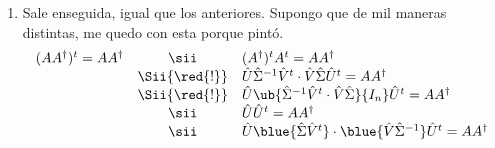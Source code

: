 \begin{enumerate}[label=(\alph*)]
\begin{enumerate}[label=\roman*.]
          \item Sale enseguida, igual que los anteriores. Supongo que de mil maneras distintas, me quedo con esta porque pintó.
                $$
                  \begin{array}{rcl}
                    (A A^\dagger)^t  = AA^\dagger
                     & \sii          &
                    (A^\dagger)^t A^t  = AA^\dagger \\
                     & \Sii{\red{!}} &
                    \hat{U} \hat{\Sigma}^{-1} \hat{V}^t
                    \cdot
                    \hat{V}\hat{\Sigma}\hat{U}^t
                    =
                    AA^\dagger                      \\
                     & \Sii{\red{!}} &
                    \hat{U}
                    \ub{
                      \hat{\Sigma}^{-1} \hat{V}^t
                      \cdot
                      \hat{V}\hat{\Sigma}
                    }{
                      I_n
                    }\hat{U}^t
                    =
                    AA^\dagger                      \\
                     & \sii          &
                    \hat{U}
                    \hat{U}^t
                    =
                    AA^\dagger                      \\
                     & \sii          &
                    \hat{U}
                    \blue{
                      \hat{\Sigma}
                      \hat{V}^t
                    }
                    \cdot
                    \blue{
                      \hat{V}
                      \hat{\Sigma}^{-1}
                    }
                    \hat{U}^t
                    =
                    AA^\dagger                      \\
                  \end{array}
                $$


\end{enumerate}
\end{enumerate}
